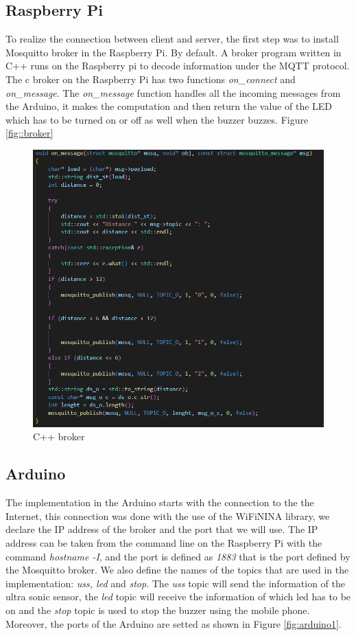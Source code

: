 \documentclass[12pt]{article}
\begin{document}
\subsection{Raspberry Pi}

To realize the connection between client and server, the first step was to install Mosquitto broker in the Raspberry Pi. By default. A broker program written in C++ runs on the Raspberry pi to decode information under the MQTT protocol. The c broker on the Raspberry Pi has two functions \textit{on\_connect} and \textit{on\_message}. The \textit{on\_message} function handles all the incoming messages from the Arduino, it makes the computation and then return the value of the LED which has to be turned on or off as well when the buzzer buzzes. Figure \ref{fig::broker}

\begin{figure}[!h]
\includegraphics[scale=0.665]{img/broker.png}
\caption{C++ broker}
\label{fig:broker}
\end{figure}

\subsection{Arduino} \label{sec:arduino}

The implementation in the Arduino starts with the connection to the the Internet, this connection was done with the use of the WiFiNINA library, we declare the IP address of the broker and the port that we will use. The IP address can be taken from the command line on the Raspberry Pi with the command \textit{hostname -I}, and the port is defined as \textit{1883} that is the port defined by the Mosquitto broker. We also define the names of the topics that are used in the implementation: \textit{uss, led} and \textit{stop}. The \textit{uss} topic will send the information of the ultra sonic sensor, the \textit{led} topic will receive the information of which led has to be on and the \textit{stop} topic is used to stop the buzzer using the mobile phone. Moreover, the ports of the Arduino are setted as shown in Figure \ref{fig:arduino1}.
\end{document}
